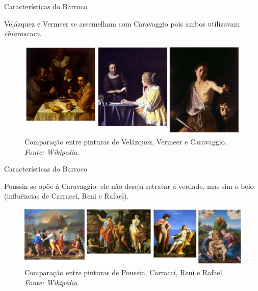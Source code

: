 \documentclass{beamer}
\begin{document}
\begin{frame}{Características do Barroco}

Velázquez e Vermeer se assemelham com Caravaggio pois ambos
  utilizavam \textit{chiaroscuro}.

\begin{figure}[h!]
  \begin{center}
    \includegraphics[width=1.0\textwidth]{figs/compara_vel_ver_car.png}
    \caption{Comparação entre pinturas de Velázquez, Vermeer e Caravaggio. \textit{Fonte: Wikipedia}.}
\end{center}
\end{figure}

\end{frame}

\begin{frame}{Características do Barroco}

Poussin se opõe à Caravaggio: ele não deseja retratar a verdade, 
mas sim o belo (influências de Carracci, Reni e Rafael).

\begin{figure}[h!]
  \begin{center}
    \includegraphics[width=1.0\textwidth]{figs/compara_poussin.png}
    \caption{Comparação entre pinturas de Poussin, Carracci, Reni e Rafael. \textit{Fonte: Wikipedia}.}
\end{center}
\end{figure}

\end{frame}

\end{document}
